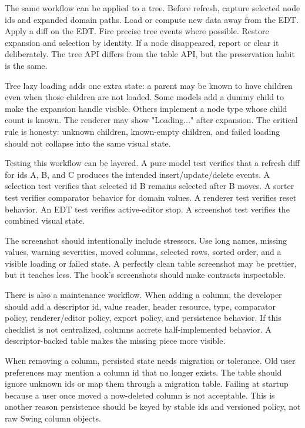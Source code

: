 The same workflow can be applied to a tree. Before refresh, capture selected node ids and expanded domain paths. Load or compute new data away from the EDT. Apply a diff on the EDT. Fire precise tree events where possible. Restore expansion and selection by identity. If a node disappeared, report or clear it deliberately. The tree API differs from the table API, but the preservation habit is the same.

Tree lazy loading adds one extra state: a parent may be known to have children even when those children are not loaded. Some models add a dummy child to make the expansion handle visible. Others implement a node type whose child count is known. The renderer may show "Loading..." after expansion. The critical rule is honesty: unknown children, known-empty children, and failed loading should not collapse into the same visual state.

Testing this workflow can be layered. A pure model test verifies that a refresh diff for ids A, B, and C produces the intended insert/update/delete events. A selection test verifies that selected id B remains selected after B moves. A sorter test verifies comparator behavior for domain values. A renderer test verifies reset behavior. An EDT test verifies active-editor stop. A screenshot test verifies the combined visual state.

The screenshot should intentionally include stressors. Use long names, missing values, warning severities, moved columns, selected rows, sorted order, and a visible loading or failed state. A perfectly clean table screenshot may be prettier, but it teaches less. The book's screenshots should make contracts inspectable.

There is also a maintenance workflow. When adding a column, the developer should add a descriptor id, value reader, header resource, type, comparator policy, renderer/editor policy, export policy, and persistence behavior. If this checklist is not centralized, columns accrete half-implemented behavior. A descriptor-backed table makes the missing piece more visible.

When removing a column, persisted state needs migration or tolerance. Old user preferences may mention a column id that no longer exists. The table should ignore unknown ids or map them through a migration table. Failing at startup because a user once moved a now-deleted column is not acceptable. This is another reason persistence should be keyed by stable ids and versioned policy, not raw Swing column objects.

